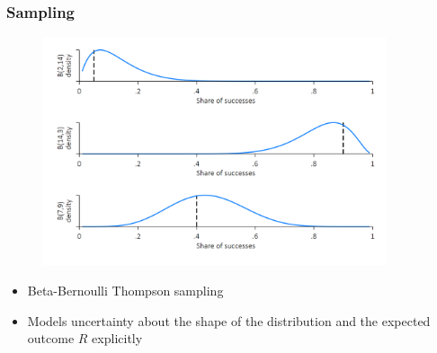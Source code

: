 \documentclass[11pt,table]{beamer}
\begin{document}
\begin{frame}\frametitle{\cite{Thompson1933,Thompson1935} Sampling}

\begin{figure}[h]
\begin{center}
{\includegraphics[width=0.9\textwidth]{figures/grafik2.png}}
\end{center}
\vspace*{-4.5ex}
\end{figure}

\begin{itemize}
    \item Beta-Bernoulli Thompson sampling
    \item Models uncertainty about the shape of the distribution and the expected outcome $R$ explicitly\hfill
\small{}

\end{itemize}

\end{frame}
\end{document}
